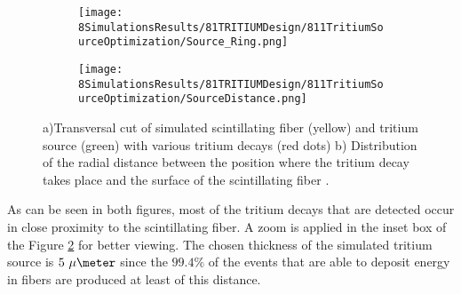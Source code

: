 \begin{figure}
\centering
    \begin{subfigure}[b]{0.45\textwidth}
    \centering
    \texttt{[image: 8SimulationsResults/81TRITIUMDesign/811TritiumSourceOptimization/Source\_Ring.png]}  
    \caption{\label{subfig:TransversalCutTritiumSource}}
    \end{subfigure}
    \hfill
    \begin{subfigure}[b]{0.45\textwidth}
    \centering
    \texttt{[image: 8SimulationsResults/81TRITIUMDesign/811TritiumSourceOptimization/SourceDistance.png]}  
    \caption{\label{subfig:DistanceDistributionTritiumSourceFiber}}
    \end{subfigure}
 \caption{a)Transversal cut of simulated scintillating fiber (yellow) and tritium source (green) with various tritium decays (red dots) b) Distribution of the radial distance between the position where the tritium decay takes place and the surface of the scintillating fiber \cite{SimulationPaperCarlos}.}
 \label{fig:TritiumSourceSimulated}
\end{figure}	

As can be seen in both figures, most of the tritium decays that are detected occur in close proximity to the scintillating fiber.  A zoom is applied in the inset box of the Figure \ref{subfig:DistanceDistributionTritiumSourceFiber} for better viewing. The chosen thickness of the simulated tritium source is $5~\mu\meter$ since the $99.4\%$ of the events that are able to deposit energy in fibers are produced at least of this distance.